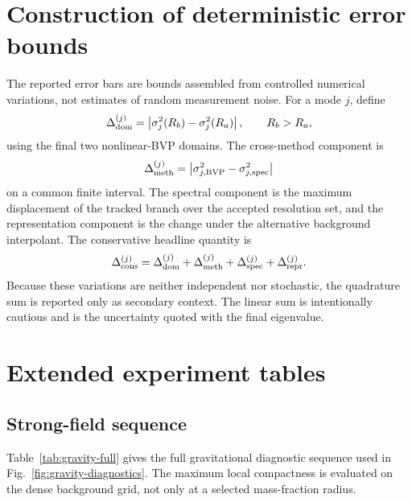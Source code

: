 \documentclass[aps,prd,preprint,onecolumn,nofootinbib,superscriptaddress,showkeys]{revtex4-2}
\begin{document}
\section{Construction of deterministic error bounds}

The reported error bars are bounds assembled from controlled numerical variations, not estimates of random measurement noise. For a mode $j$, define
\begin{equation}
 \Delta_{\rm dom}^{(j)}
 =\left|\sigma_{j}^{2}(R_{b})-\sigma_{j}^{2}(R_{a})\right|,
 \qquad R_b>R_a,
\end{equation}
using the final two nonlinear-BVP domains. The cross-method component is
\begin{equation}
 \Delta_{\rm meth}^{(j)}
 =\left|\sigma_{j,\mathrm{BVP}}^{2}
 -\sigma_{j,\mathrm{spec}}^{2}\right|
\end{equation}
on a common finite interval. The spectral component is the maximum displacement of the tracked branch over the accepted resolution set, and the representation component is the change under the alternative background interpolant. The conservative headline quantity is
\begin{equation}
 \Delta_{\rm cons}^{(j)}
 =\Delta_{\rm dom}^{(j)}+\Delta_{\rm meth}^{(j)}
 +\Delta_{\rm spec}^{(j)}+\Delta_{\rm repr}^{(j)}.
\end{equation}
Because these variations are neither independent nor stochastic, the quadrature sum is reported only as secondary context. The linear sum is intentionally cautious and is the uncertainty quoted with the final eigenvalue.

\iffalse
\section{Extended experiment tables}\label{app:extended-tables}

\subsection{Strong-field sequence}

Table~\ref{tab:gravity-full} gives the full gravitational diagnostic sequence used in Fig.~\ref{fig:gravity-diagnostics}. The maximum local compactness is evaluated on the dense background grid, not only at a selected mass-fraction radius.
\end{document}
